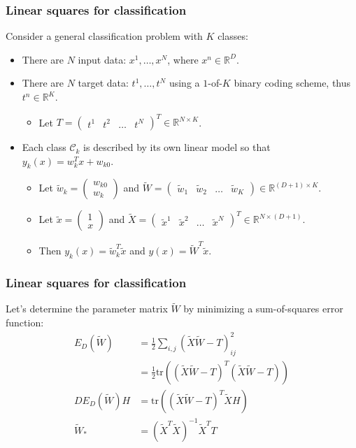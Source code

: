 \documentclass{beamer}
\begin{document}
\begin{frame}
    \frametitle{Linear squares for classification}
    Consider a general classification problem with $K$ classes:
    \begin{itemize}
        \item There are $N$ input data: $x^{1},\hdots,x^{N}$, where $x^{n}\in\mathbb{R}^{D}$.
        \item There are $N$ target data: $t^{1},\hdots,t^{N}$ using a $1$-of-$K$ binary coding scheme, thus $t^{n}\in\mathbb{R}^{K}$.
        \begin{itemize}
            \item Let $T=\begin{pmatrix}
                t^{1}&t^{2}&\hdots&t^{N}
            \end{pmatrix}^{T}\in\mathbb{R}^{N\times{}K}$.
        \end{itemize}
        \item Each class $\mathcal{C}_{k}$ is described by its own linear model so that $y_k(x)=w_{k}^{T}x+w_{k0}$.
        \begin{itemize}
            \item Let $\tilde{w}_{k}=\begin{pmatrix}
                w_{k0} \\
                w_{k}
            \end{pmatrix}$ and $\tilde{W}=\begin{pmatrix}
                \tilde{w}_{1}&\tilde{w}_{2}&\hdots&\tilde{w}_{K}
            \end{pmatrix}\in\mathbb{R}^{(D+1)\times{}K}$.
            \item Let $\tilde{x}=\begin{pmatrix}
                1 \\
                x
            \end{pmatrix}$ and $\tilde{X}=\begin{pmatrix}
                \tilde{x}^{1}&\tilde{x}^{2}&\hdots&\tilde{x}^{N}
            \end{pmatrix}^{T}\in\mathbb{R}^{N\times(D+1)}$.
            \item Then $y_k(x)=\tilde{w}_{k}^{T}\tilde{x}$ and $y(x)=\tilde{W}^{T}\tilde{x}$.
        \end{itemize}
    \end{itemize}
\end{frame}

\begin{frame}
    \frametitle{Linear squares for classification}
    Let's determine the parameter matrix $\tilde{W}$ by minimizing a sum-of-squares error function:
    \begin{align*}
        E_{D}(\tilde{W})&=\frac{1}{2}\sum_{i,j}(\tilde{X}\tilde{W}-T)_{ij}^{2} \\
        &=\frac{1}{2}\mathrm{tr}((\tilde{X}\tilde{W}-T)^{T}(\tilde{X}\tilde{W}-T)) \\
        DE_{D}(\tilde{W})H&=\mathrm{tr}((\tilde{X}\tilde{W}-T)^{T}\tilde{X}H) \\
        \tilde{W}_{*}&=(\tilde{X}^{T}\tilde{X})^{-1}\tilde{X}^{T}T
    \end{align*}
\end{frame}
\end{document}
